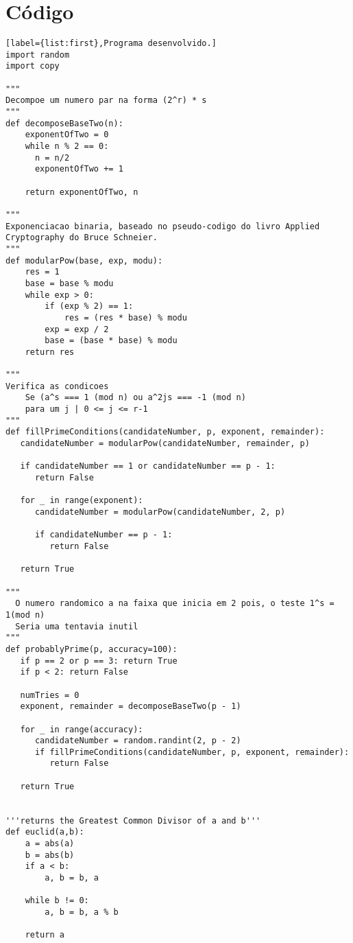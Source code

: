 \documentclass[a4paper,11pt]{article}
\theoremstyle{mytheor}
\begin{document}
\section*{Código}
\begin{lstlisting}[label={list:first},Programa desenvolvido.]
import random
import copy

"""
Decompoe um numero par na forma (2^r) * s
"""
def decomposeBaseTwo(n):
    exponentOfTwo = 0
    while n % 2 == 0:
      n = n/2
      exponentOfTwo += 1
 
    return exponentOfTwo, n

"""
Exponenciacao binaria, baseado no pseudo-codigo do livro Applied Cryptography do Bruce Schneier.
"""
def modularPow(base, exp, modu):
    res = 1
    base = base % modu
    while exp > 0:
        if (exp % 2) == 1:
            res = (res * base) % modu
        exp = exp / 2
        base = (base * base) % modu
    return res

"""
Verifica as condicoes
    Se (a^s === 1 (mod n) ou a^2js === -1 (mod n) 
    para um j | 0 <= j <= r-1
"""
def fillPrimeConditions(candidateNumber, p, exponent, remainder):
   candidateNumber = modularPow(candidateNumber, remainder, p)
 
   if candidateNumber == 1 or candidateNumber == p - 1:
      return False
 
   for _ in range(exponent):
      candidateNumber = modularPow(candidateNumber, 2, p)
 
      if candidateNumber == p - 1:
         return False
 
   return True
 
"""
  O numero randomico a na faixa que inicia em 2 pois, o teste 1^s = 1(mod n)
  Seria uma tentavia inutil
"""
def probablyPrime(p, accuracy=100):
   if p == 2 or p == 3: return True
   if p < 2: return False
 
   numTries = 0
   exponent, remainder = decomposeBaseTwo(p - 1)
 
   for _ in range(accuracy):
      candidateNumber = random.randint(2, p - 2)
      if fillPrimeConditions(candidateNumber, p, exponent, remainder):
         return False
 
   return True


'''returns the Greatest Common Divisor of a and b'''
def euclid(a,b):
    a = abs(a)
    b = abs(b)
    if a < b:
        a, b = b, a

    while b != 0:
        a, b = b, a % b

    return a


\end{lstlisting}
\end{document}
